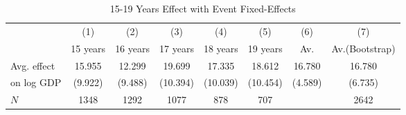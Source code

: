 \begin{table}[htbp]\centering
\caption{15-19 Years Effect with Event Fixed-Effects}
\begin{tabular}{l*{7}{c}}
\hline\hline
            &\multicolumn{1}{c}{(1)}&\multicolumn{1}{c}{(2)}&\multicolumn{1}{c}{(3)}&\multicolumn{1}{c}{(4)}&\multicolumn{1}{c}{(5)}&\multicolumn{1}{c}{(6)}&\multicolumn{1}{c}{(7)}\\
            &    15 years&    16 years&    17 years&    18 years&    19 years&         Av.&Av.(Bootstrap)\\
\hline
Avg. effect &      15.955&      12.299&      19.699&      17.335&      18.612&      16.780&      16.780\\
on log GDP  &     (9.922)&     (9.488)&    (10.394)&    (10.039)&    (10.454)&     (4.589)&     (6.735)\\
\hline
\(N\)       &        1348&        1292&        1077&         878&         707&            &        2642\\
\hline\hline
\end{tabular}
\end{table}

